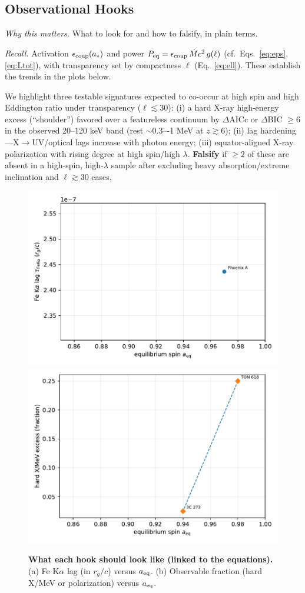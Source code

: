 \documentclass[twocolumn]{aastex701}
\begin{document}
\clearpage
\subsection{Observational Hooks}\label{sec:obs}
\suppressfloats[t]  %

\noindent\textit{Why this matters.} What to look for and how to falsify, in plain terms.

\noindent\textit{Recall.}
Activation $\epsilon_{\rm coup}(a_\ast)$ and power $P_{\rm eq}=\epsilon_{\rm coup}\,\dot{M}c^2\,g(\ell)$
(cf.\ Eqs.~\eqref{eq:eps}, \eqref{eq:Ltot}), with transparency set by compactness $\ell$ (Eq.~\eqref{eq:ell}).
These establish the trends in the plots below.

We highlight three testable signatures expected to co-occur at high spin and high Eddington ratio under transparency ($\ell\!\lesssim\!30$):
(i) a hard X-ray high-energy excess (“shoulder”) favored over a featureless continuum by $\Delta$AICc or $\Delta$BIC $\ge 6$ in the observed 20–120 keV band (rest $\sim$0.3–-1 MeV at $z\gtrsim6$);
(ii) lag hardening—X$\to$UV/optical lags increase with photon energy;
(iii) equator-aligned X-ray polarization with rising degree at high spin/high $\lambda$.
\textbf{Falsify} if $\ge2$ of these are absent in a high-spin, high-$\lambda$ sample after excluding heavy absorption/extreme inclination and $\ell\!\gtrsim\!30$ cases.
\begin{figure}[t!]
  \vspace*{2pt}
  \centering
  \includegraphics[width=.49\columnwidth]{Fig5a.pdf}
  \hfill
  \includegraphics[width=.49\columnwidth]{Fig5b.pdf}
  \caption{\textbf{What each hook should look like (linked to the equations).} 
  (a) Fe K$\alpha$ lag (in $r_g/c$) versus $a_{\rm eq}$. 
  (b) Observable fraction (hard X/MeV or polarization) versus $a_{\rm eq}$.}
  \label{fig:fig5}
\end{figure}
\end{document}
